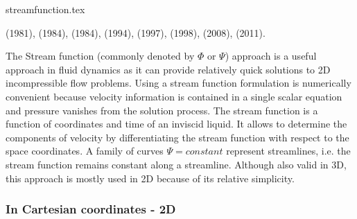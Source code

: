 \begin{flushright} {\tiny {\color{gray} streamfunction.tex}} \end{flushright}

\Literature 
\textcite{scja81} (1981),
\textcite{chyu84} (1984),
\textcite{chri84} (1984),
\textcite{hayu94} (1994),
\textcite{olwh97} (1997),
\textcite{giju98} (1998),
\textcite{vanv08} (2008),
\textcite{vanj11} (2011).

\vspace{0.5cm}

The Stream function (commonly denoted by $\Phi$ or $\Psi$) approach is a useful approach in 
fluid dynamics as it 
can provide relatively quick solutions to 2D incompressible flow problems.
Using a stream function
formulation is numerically convenient because velocity information is contained in a single scalar equation
and pressure vanishes from the solution process.
The stream function is a function of coordinates and time of an inviscid liquid.
It allows to determine the components of velocity by differentiating the stream function 
with respect to the space coordinates. 
A family of curves $\Psi = constant$ represent {\color{olive} streamlines}, i.e. 
the stream function remains constant along a streamline. 
Although also valid in 3D, this approach is mostly used in 2D because of its 
relative simplicity.

\subsubsection{In Cartesian coordinates - 2D}

